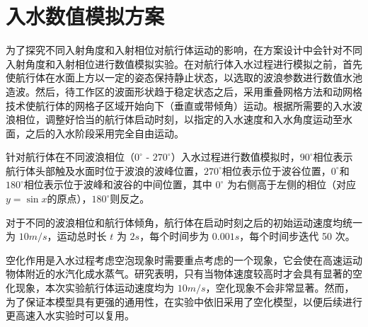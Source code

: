 \section{入水数值模拟方案}

为了探究不同入射角度和入射相位对航行体运动的影响，在方案设计中会针对不同入射角度和入射相位进行数值模拟实验。在对航行体入水过程进行模拟之前，首先使航行体在水面上方以一定的姿态保持静止状态，以选取的波浪参数进行数值水池造波。然后，待工作区的波面形状趋于稳定状态之后，采用重叠网格方法和动网格技术使航行体的网格子区域开始向下（垂直或带倾角）运动。根据所需要的入水波浪相位，调整好恰当的航行体启动时刻，以指定的入水速度和入水角度运动至水面，之后的入水阶段采用完全自由运动。

针对航行体在不同波浪相位（$0 ^\circ$ - $270 ^\circ$）入水过程进行数值模拟时，$90^\circ$相位表示航行体头部触及水面时位于波浪的波峰位置，$270^\circ$相位表示位于波谷位置，$0^\circ$和$180^\circ$相位表示位于波峰和波谷的中间位置，其中 $0^\circ$ 为右侧高于左侧的相位（对应$y = \sin x$的原点），$180^\circ$则反之。

对于不同的波浪相位和航行体倾角，航行体在启动时刻之后的初始运动速度均统一为 $10 m/s$，运动总时长 $t$ 为 $2s$，每个时间步为 $0.001s$，每个时间步迭代 50 次。

空化作用是入水过程考虑空泡现象时需要重点考虑的一个现象，它会使在高速运动物体附近的水汽化成水蒸气。研究表明，只有当物体速度较高时才会具有显著的空化现象，本次实验航行体运动速度均为 $10 m/s$，空化现象不会非常显著。然而，为了保证本模型具有更强的通用性，在实验中依旧采用了空化模型，以便后续进行更高速入水实验时可以复用。